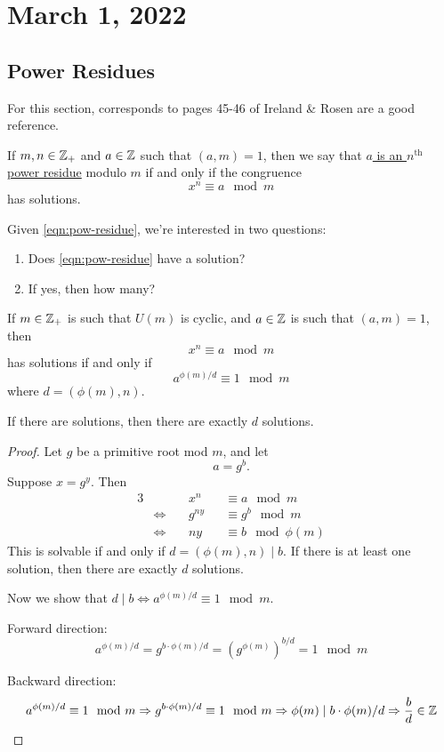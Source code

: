 \section{March 1, 2022}
\subsection{Power Residues}
For this section, corresponds to pages 45-46 of Ireland \& Rosen are a good reference.
\begin{definition}
    If $m, n\in \mathbb Z_+$ and $a\in \mathbb Z$ such that $(a, m) = 1$, then we say that \ul{$a$ is an $n^\mathrm{th}$ power residue} modulo $m$ if and only if the congruence
    \begin{equation}\label{eqn:pow-residue}x^n\equiv a\mod m\end{equation}
    has solutions.
\end{definition}
Given \cref{eqn:pow-residue}, we're interested in two questions:
\begin{enumerate}[1)]
    \item Does \cref{eqn:pow-residue} have a solution?
    \item If yes, then how many?
\end{enumerate}

\begin{proposition}\label{prop:4.2.1}
    If $m\in\mathbb Z_+$ is such that $U(m)$ is cyclic, and $a\in\mathbb Z$ is such that $(a, m)=1$, then
    \[x^n\equiv a\mod m\]
    has solutions if and only if
    \[a^{\phi(m)/d}\equiv 1\mod m\]
    where $d = (\phi(m), n)$.

    If there are solutions, then there are exactly $d$ solutions.
\end{proposition}
\begin{proof}
    Let $g$ be a primitive root mod $m$, and let
    \[a=g^b.\]
    Suppose $x = g^y$. Then
    \begin{alignat*}{3}
         &        &  & x^n    &  & \equiv a\mod m       \\
         & \iff\  &  & g^{ny} &  & \equiv g^b\mod m     \\
         & \iff   &  & ny     &  & \equiv b\mod \phi(m)
    \end{alignat*}
    This is solvable if and only if $d=(\phi(m), n)\mid b$. If there is at least one solution, then there are exactly $d$ solutions.

    Now we show that $d\mid b\Leftrightarrow a^{\phi(m)/d}\equiv 1\mod m$.

    Forward direction:
    \[a^{\phi(m)/d} = g^{b\cdot \phi(m)/d} = \left(g^{\phi(m)}\right)^{b/d} = 1\mod m\]

    Backward direction:
    \[a^{\phi(m)/d}\equiv 1\mod m \Rightarrow g^{b\cdot \phi(m)/d}\equiv 1\mod m \Rightarrow \phi(m)\mid b\cdot \phi(m)/d \Rightarrow \frac{b}{d}\in\mathbb Z\]
\end{proof}

